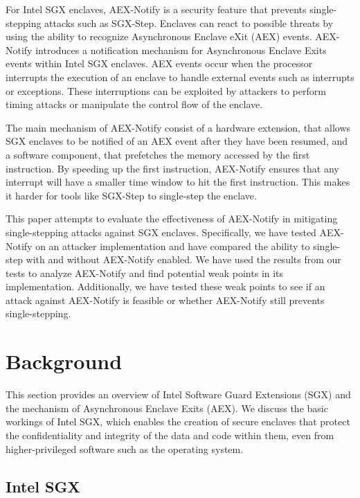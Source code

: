\documentclass{llncs}
\begin{document}
For Intel SGX enclaves, AEX-Notify \cite{ConstableBCXXAK23} is a security feature that prevents
single-stepping attacks such as SGX-Step.
Enclaves can react to possible threats by using the ability to recognize
Asynchronous Enclave eXit (AEX) events.
AEX-Notify introduces a notification mechanism for Asynchronous Enclave Exits
events within Intel SGX enclaves.
AEX events occur when the processor interrupts the execution of an enclave to
handle external events such as interrupts or exceptions.
These interruptions can be exploited by attackers to perform timing attacks or
manipulate the control flow of the enclave.

The main mechanism of AEX-Notify consist of a hardware extension, that allows
SGX enclaves to be notified of an AEX event after they have been resumed, and a
software component, that prefetches the memory accessed by the first
instruction.
By speeding up the first instruction, AEX-Notify ensures that
any interrupt will have a smaller time window to hit the first instruction.
This makes it harder for tools like SGX-Step to single-step the enclave.

This paper attempts to evaluate the effectiveness of AEX-Notify in mitigating
single-stepping attacks against SGX enclaves.
Specifically, we have tested AEX-Notify on an attacker implementation and have
compared the ability to single-step with and without AEX-Notify enabled.
We have used the results from our tests to analyze AEX-Notify and find
potential weak points in its implementation.
Additionally, we have tested these weak points to see if an attack against
AEX-Notify is feasible or whether AEX-Notify still prevents single-stepping.

\section{Background}

This section provides an overview of Intel Software Guard Extensions (SGX) and
the mechanism of Asynchronous Enclave Exits (AEX).
We discuss the basic workings of Intel SGX, which enables the creation of
secure enclaves that protect the confidentiality and integrity of the data and
code within them, even from higher-privileged software such as the operating
system.

\subsection{Intel SGX}
\end{document}
